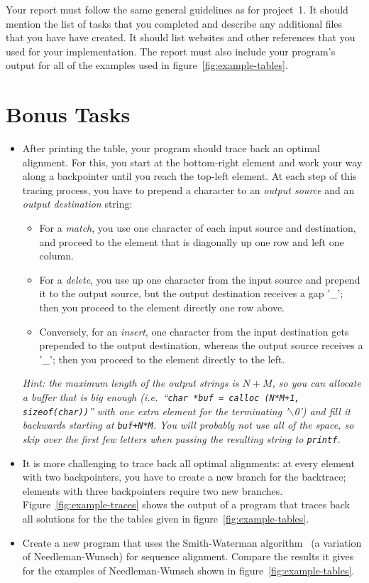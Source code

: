 \documentclass[a4paper,10pt]{article}
\begin{document}
Your report must follow the same general guidelines as for project~1.
It should mention the list of tasks that you completed and describe any additional files that you have have created.
It should list websites and other references that you used for your implementation.
The report must also include your program's output for all of the examples used in figure~\ref{fig:example-tables}.



\section{Bonus Tasks}

\begin{itemize}
\item
  After printing the table, your program should trace back an optimal alignment.
  For this, you start at the bottom-right element and work your way along a backpointer until you reach the top-left element.
  At each step of this tracing process, you have to prepend a character to an \emph{output source} and an \emph{output destination} string:
  \begin{itemize}
  \item
    For a \emph{match}, you use one character of each input source and destination, and proceed to the element that is diagonally up one row and left one column.
  \item
    For a \emph{delete}, you use up one character from the input source and prepend it to the output source, but the output destination receives a gap '\_';
    then you proceed to the element directly one row above.
  \item
    Conversely, for an \emph{insert}, one character from the input destination gets prepended to the output destination, whereas the output source receives a '\_';
    then you proceed to the element directly to the left.
  \end{itemize}
  \emph{Hint: the maximum length of the output strings is $N+M$, so you can allocate a buffer that is big enough (i.e.\ ``\texttt{char *buf = calloc (N*M+1, sizeof(char))}'' with one extra element for the terminating '$\backslash$0') and fill it backwards starting at \texttt{buf+N*M}.
    You will probably not use all of the space, so skip over the first few letters when passing the resulting string to \texttt{printf}.}
\item
  It is more challenging to trace back all optimal alignments:
  at every element with two backpointers, you have to create a new branch for the backtrace; elements with three backpointers require two new branches.
  Figure~\ref{fig:example-traces} shows the output of a program that traces back all solutions for the the tables given in figure~\ref{fig:example-tables}.
\item
  Create a new program that uses the Smith-Waterman algorithm~\cite{wikipedia:smith-waterman} (a variation of Needleman-Wunsch) for sequence alignment.
  Compare the results it gives for the examples of Needleman-Wunsch shown in figure~\ref{fig:example-tables}.
\end{itemize}
\end{document}
